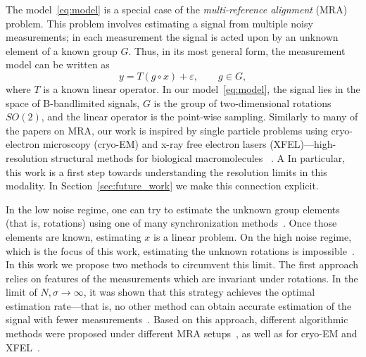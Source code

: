 \documentclass[english,12pt]{article}
\numberwithin{equation}{section}
\numberwithin{thm}{section} %
\begin{document}
The model~\eqref{eq:model} is a special case of the \emph{multi-reference alignment} (MRA) problem. This problem involves estimating a signal from multiple noisy measurements; in each measurement the signal is acted upon by an unknown element of a known group $G$. 
Thus, in its most general form, the measurement model can be written as 
\begin{equation}
y = T(g\circ x) +\varepsilon, \qquad g\in G,
\end{equation}
where $T$ is a known linear operator. 
In our model~\eqref{eq:model}, the signal lies in the space of B-bandlimited signals, $G$ is the group of two-dimensional rotations $SO(2)$, and the linear operator is the point-wise sampling.
Similarly to many of the papers on MRA, our work is inspired by single particle problems using cryo-electron microscopy (cryo-EM) and x-ray free electron lasers (XFEL)---high-resolution structural methods for biological macromolecules  ~\cite{frank2006three,kuhlbrandt2014resolution,singer2018mathematics}. 
A
In particular, this work is a first step towards understanding the resolution limits in this modality. In Section~\ref{sec:future_work} we make this connection explicit.


In the low noise regime, one can try to estimate the unknown group elements (that is, rotations) using one of many synchronization methods~\cite{singer2011angular,bandeira2015non,boumal2016nonconvex,chen2018projected,singer2011three}.
Once those elements are known, estimating $x$ is a linear problem. 
On the high noise regime, which is the focus of this work, estimating the unknown rotations is impossible~\cite{bendory2018toward,aguerrebere2016fundamental}.
In this work we propose two methods to circumvent this limit. 
The first approach relies on features of the measurements which are invariant 
under rotations. In the limit of $N,\sigma\to\infty$, it was shown that this strategy achieves the optimal  estimation rate---that is, no other method can obtain accurate estimation of the signal with fewer measurements~\cite{bandeira2017optimal,bandeira2017estimation,abbe2018multireference,abbe2018estimation}. Based on this approach, different algorithmic methods were proposed under different MRA setups~\cite{bendory2017bispectrum,perry2017sample,abbe2018multireference,boumal2018heterogeneous,chen2018spectral,ma2018heterogeneous,bandeira2014multireference}, as well as for  cryo-EM and XFEL~\cite{kam1980reconstruction,liu2013three,kurta2017correlations,levin20173d,bendory2018toward,pande2018ab,von2018structure}. 
\end{document}
